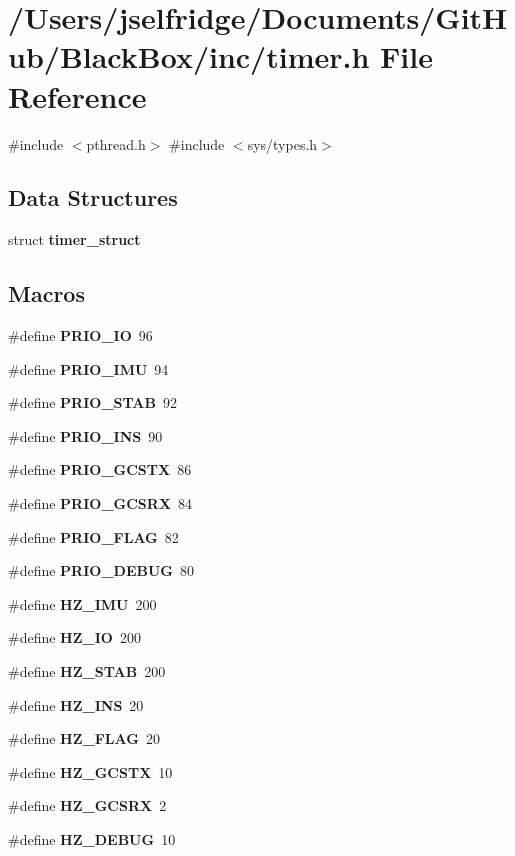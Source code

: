 \section{/\+Users/jselfridge/\+Documents/\+Git\+Hub/\+Black\+Box/inc/timer.h File Reference}
\label{timer_8h}
{\ttfamily \#include $<$pthread.\+h$>$}\newline
{\ttfamily \#include $<$sys/types.\+h$>$}\newline
\subsection*{Data Structures}
\begin{DoxyCompactItemize}
\item 
struct \textbf{ timer\+\_\+struct}
\end{DoxyCompactItemize}
\subsection*{Macros}
\begin{DoxyCompactItemize}
\item 
\#define \textbf{ P\+R\+I\+O\+\_\+\+IO}~96
\item 
\#define \textbf{ P\+R\+I\+O\+\_\+\+I\+MU}~94
\item 
\#define \textbf{ P\+R\+I\+O\+\_\+\+S\+T\+AB}~92
\item 
\#define \textbf{ P\+R\+I\+O\+\_\+\+I\+NS}~90
\item 
\#define \textbf{ P\+R\+I\+O\+\_\+\+G\+C\+S\+TX}~86
\item 
\#define \textbf{ P\+R\+I\+O\+\_\+\+G\+C\+S\+RX}~84
\item 
\#define \textbf{ P\+R\+I\+O\+\_\+\+F\+L\+AG}~82
\item 
\#define \textbf{ P\+R\+I\+O\+\_\+\+D\+E\+B\+UG}~80
\item 
\#define \textbf{ H\+Z\+\_\+\+I\+MU}~200
\item 
\#define \textbf{ H\+Z\+\_\+\+IO}~200
\item 
\#define \textbf{ H\+Z\+\_\+\+S\+T\+AB}~200
\item 
\#define \textbf{ H\+Z\+\_\+\+I\+NS}~20
\item 
\#define \textbf{ H\+Z\+\_\+\+F\+L\+AG}~20
\item 
\#define \textbf{ H\+Z\+\_\+\+G\+C\+S\+TX}~10
\item 
\#define \textbf{ H\+Z\+\_\+\+G\+C\+S\+RX}~2
\item 
\#define \textbf{ H\+Z\+\_\+\+D\+E\+B\+UG}~10
\end{DoxyCompactItemize}
